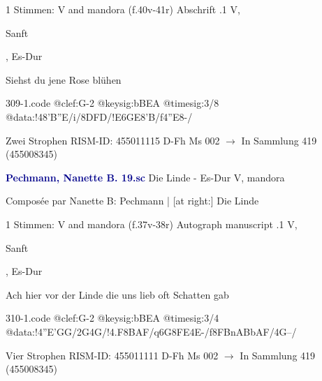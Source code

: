 \documentclass[twocolumn]{book}
\begin{document}
\newline \textcolor{darkblue}{}  1 Stimmen: V and mandora  (f.40v-41r)
\newline Abschrift
.1  V, \begin{itshape}Sanft\end{itshape}, Es-Dur
\newline \begin{footnotesize} Siehst du jene Rose blühen \end{footnotesize}  
\begin{filecontents*}{309-1.code}
@clef:G-2
@keysig:bBEA
@timesig:3/8
@data:!48'B''E/i/{8DFD}/!E{6GE}8'B/f4''E8-/
\end{filecontents*}
\newline
%
\newline Zwei Strophen
\newline RISM-ID: 455011115
\newline D-Fh  Ms 002
\newline $\rightarrow$ In Sammlung 419 (455008345)
      
\newline \par \vspace{7pt} \textcolor{darkblue}{\textbf{Pechmann, Nanette B.  19.sc}}
\newline Die Linde - Es-Dur
\newline V, mandora
\newline \begin{itshape}[heading, f.37v:] Composée par Nanette B: Pechmann | [at right:] Die Linde\end{itshape} 
\newline \textcolor{darkblue}{}  1 Stimmen: V and mandora  (f.37v-38r)
\newline Autograph manuscript
.1  V, \begin{itshape}Sanft\end{itshape}, Es-Dur
\newline \begin{footnotesize} Ach hier vor der Linde die uns lieb oft Schatten gab \end{footnotesize}  
\begin{filecontents*}{310-1.code}
@clef:G-2
@keysig:bBEA
@timesig:3/4
@data:!4''E'GG/2G4G/!4.F8BAF/q6G{8FE}4E-/f{8FBnABbAF}/4G--/
\end{filecontents*}
\newline
%
\newline Vier Strophen
\newline RISM-ID: 455011111
\newline D-Fh  Ms 002
\newline $\rightarrow$ In Sammlung 419 (455008345)
      
\end{document}
